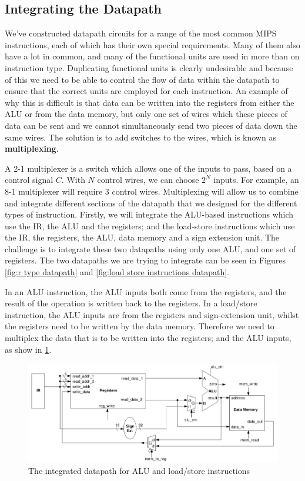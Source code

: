 \documentclass{article}
\begin{document}
	\subsection{Integrating the Datapath}
	We've constructed datapath circuits for a range of the most common MIPS instructions, each of which has their own special requirements. Many of them also have a lot in common, and many of the functional units are used in more than on instruction type. Duplicating functional units is clearly undesirable and because of this we need to be able to control the flow of data within the datapath to ensure that the correct units are employed for each instruction. An example of why this is difficult is that data can be written into the registers from either the ALU or from the data memory, but only one set of wires which these pieces of data can be sent and we cannot simultaneously send two pieces of data down the same wires. The solution is to add switches to the wires, which is known as \textbf{multiplexing}. 
	\par 
	A 2-1 multiplexer is a switch which allows one of the inputs to pass, based on a control signal $C$. With $N$ control wires, we can choose $2^{N}$ inputs. For example, an 8-1 multiplexer will require 3 control wires. Multiplexing will allow us to combine and integrate different sections of the datapath that we designed for the different types of instruction. Firstly, we will integrate the ALU-based instructions which use the IR, the ALU and the registers; and the load-store instructions which use the IR, the registers, the ALU, data memory and a sign extension unit. The challenge is to integrate these two datapaths using only one ALU, and one set of registers. The two datapaths we are trying to integrate can be seen in Figures \ref{fig:r type datapath} and \ref{fig:load store instructions datapath}.
	
	\par 
	In an ALU instruction, the ALU inputs both come from the registers, and the result of the operation is written back to the registers. In a load/store instruction, the ALU inputs are from the registers and sign-extension unit, whilst the registers need to be written by the data memory. Therefore we need to multiplex the data that is to be written into the registers; and the ALU inputs, as show in \ref{fig:alu load store datapath}.
	
	\begin{figure}
		\centering
		\includegraphics[width=\textwidth]{alu_load_store_datapath}
		\caption{The integrated datapath for ALU and load/store instructions}
		\label{fig:alu load store datapath}
	\end{figure}		
	
\end{document}
